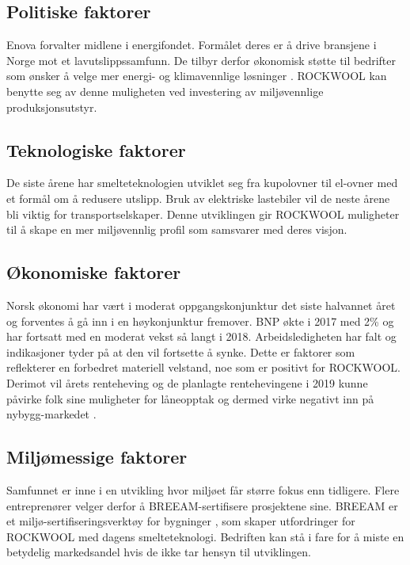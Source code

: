 \subsection{Politiske faktorer}
Enova forvalter midlene i energifondet. Formålet deres er å drive bransjene i Norge mot et lavutslippssamfunn. De tilbyr derfor økonomisk støtte til bedrifter som ønsker å velge mer energi- og klimavennlige løsninger \cite{Enova}. ROCKWOOL kan benytte seg av denne muligheten ved investering av miljøvennlige produksjonsutstyr.

\subsection{Teknologiske faktorer}
De siste årene har smelteteknologien utviklet seg fra kupolovner til el-ovner med et formål om å redusere utslipp. Bruk av elektriske lastebiler vil de neste årene bli viktig for transportselskaper. Denne utviklingen gir ROCKWOOL muligheter til å skape en mer miljøvennlig profil som samsvarer med deres visjon.

\subsection{Økonomiske faktorer}
Norsk økonomi har vært i moderat oppgangskonjunktur det siste halvannet året og forventes å gå inn i en høykonjunktur fremover. BNP økte i 2017 med 2\% og har fortsatt med en moderat vekst så langt i 2018. Arbeidsledigheten har falt og indikasjoner tyder på at den vil fortsette å synke. Dette er faktorer som reflekterer en forbedret materiell velstand, noe som er positivt for ROCKWOOL. Derimot vil årets renteheving og de planlagte rentehevingene i 2019 kunne påvirke folk sine muligheter for låneopptak og dermed virke negativt inn på nybygg-markedet \cite{SSB nasjonalregnskap}.

\subsection{Miljømessige faktorer}
Samfunnet er inne i en utvikling hvor miljøet får større fokus enn tidligere. Flere entreprenører velger derfor å BREEAM-sertifisere prosjektene sine. BREEAM er et miljø-\newline sertifiseringsverktøy for bygninger \cite{BREEAM}, som skaper utfordringer for ROCKWOOL med dagens smelteteknologi. Bedriften kan stå i fare for å miste en betydelig markedsandel hvis de ikke tar hensyn til utviklingen.

